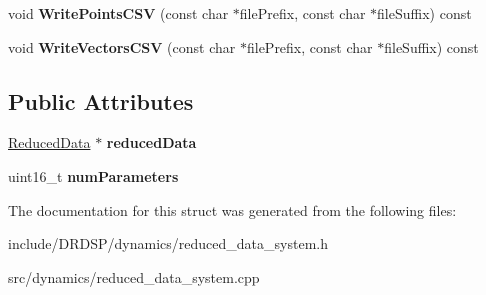 \begin{DoxyCompactItemize}
\item 
\hypertarget{struct_d_r_d_s_p_1_1_reduced_data_system_a3cee3fafe99a55ab69f54a97a6694b5b}{void {\bfseries Write\-Points\-C\-S\-V} (const char $\ast$file\-Prefix, const char $\ast$file\-Suffix) const }\label{struct_d_r_d_s_p_1_1_reduced_data_system_a3cee3fafe99a55ab69f54a97a6694b5b}

\item 
\hypertarget{struct_d_r_d_s_p_1_1_reduced_data_system_a90193676fbce0169bc7491ab686d79fa}{void {\bfseries Write\-Vectors\-C\-S\-V} (const char $\ast$file\-Prefix, const char $\ast$file\-Suffix) const }\label{struct_d_r_d_s_p_1_1_reduced_data_system_a90193676fbce0169bc7491ab686d79fa}

\end{DoxyCompactItemize}
\subsection*{Public Attributes}
\begin{DoxyCompactItemize}
\item 
\hypertarget{struct_d_r_d_s_p_1_1_reduced_data_system_a0a04590789144be3af1cab48ff813c81}{\hyperlink{struct_d_r_d_s_p_1_1_reduced_data}{Reduced\-Data} $\ast$ {\bfseries reduced\-Data}}\label{struct_d_r_d_s_p_1_1_reduced_data_system_a0a04590789144be3af1cab48ff813c81}

\item 
\hypertarget{struct_d_r_d_s_p_1_1_reduced_data_system_a6c869c5a4c0f4346d1c9717ee0667f26}{uint16\-\_\-t {\bfseries num\-Parameters}}\label{struct_d_r_d_s_p_1_1_reduced_data_system_a6c869c5a4c0f4346d1c9717ee0667f26}

\end{DoxyCompactItemize}


The documentation for this struct was generated from the following files\-:\begin{DoxyCompactItemize}
\item 
include/\-D\-R\-D\-S\-P/dynamics/reduced\-\_\-data\-\_\-system.\-h\item 
src/dynamics/reduced\-\_\-data\-\_\-system.\-cpp\end{DoxyCompactItemize}
